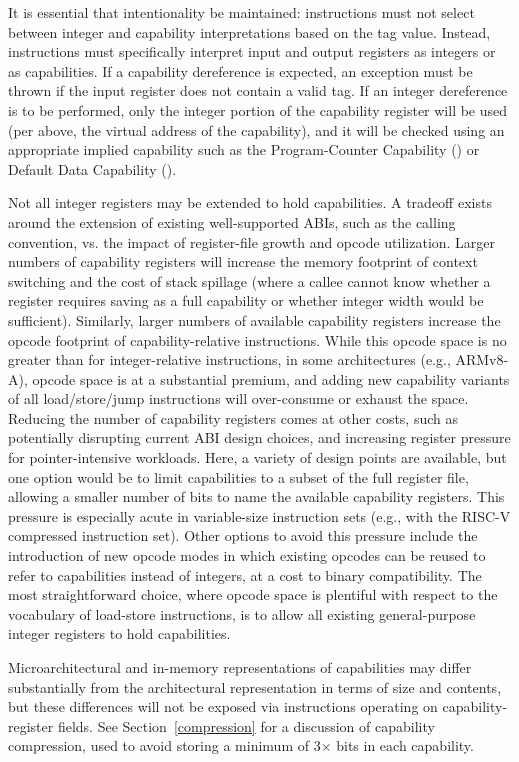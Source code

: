It is essential that intentionality be maintained: instructions
must not select between integer and capability interpretations based on the
tag value.
Instead, instructions must specifically interpret input and output registers
as integers or as capabilities.
If a capability dereference is expected, an exception must be thrown if the
input register does not contain a valid tag.
If an integer dereference is to be performed, only the integer portion of the
capability register will be used (per above, the virtual address of the
capability), and it will be checked using an appropriate implied
capability such as the Program-Counter Capability (\PCC{}) or Default Data
Capability (\DDC{}).

Not all
integer registers may be extended to hold capabilities.
A tradeoff exists around the extension of existing well-supported ABIs, such
as the calling convention, vs. the impact of register-file growth and opcode
utilization.
Larger numbers of capability registers will increase the memory footprint of
context switching and the cost of stack spillage (where a callee cannot know
whether a register requires saving as a full capability or whether integer
width would be sufficient).
Similarly, larger numbers of available capability registers increase the
opcode footprint of capability-relative instructions.
While this opcode space is no greater than for integer-relative instructions,
in some architectures (e.g., ARMv8-A), opcode space is at a substantial premium,
and adding new capability variants of all load/store/jump instructions will
over-consume or exhaust the space.
Reducing the number of capability registers comes at other costs, such as
potentially disrupting current ABI design choices, and increasing register
pressure for pointer-intensive workloads.
Here, a variety of design points are available, but one option would be to
limit capabilities to a subset of the full register file, allowing a smaller
number of bits to name the available capability registers.
This pressure is especially acute in variable-size instruction sets (e.g.,
with the RISC-V compressed instruction set).
Other options to avoid this pressure include the introduction of new opcode
modes in which existing opcodes can be reused to refer to capabilities instead
of integers, at a cost to binary compatibility.
The most straightforward choice, where opcode space is plentiful with respect
to the vocabulary of load-store instructions, is to allow all existing
general-purpose integer registers to hold capabilities.

Microarchitectural and in-memory representations of capabilities may differ
substantially from the architectural representation in terms of size and
contents, but these differences will not be exposed via instructions operating
on capability-register fields.
See Section~\ref{compression} for a discussion of capability compression,
used to avoid storing a minimum of 3$\times$ \xlen{} bits in each capability.

